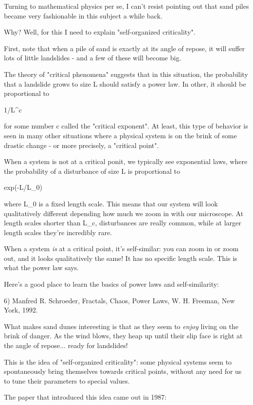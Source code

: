 Turning to mathematical physics per se, I can't resist pointing out
that sand piles became very fashionable in this subject a 
while back.

Why?  Well, for this I need to explain "self-organized criticality".

First, note that when a pile of sand is exactly at its angle of repose, 
it will suffer lots of little landslides - and a few of these will become 
big.  

The theory of "critical phenomena" suggests that in this situation,
the probability that a landslide grows to size L should satisfy a 
power law.  In other, it should be proportional to 

1/L^{c} 

for some number c called the "critical exponent".  At least, this 
type of behavior is seen in many other situations where a physical 
system is on the brink of some drastic change - or more precisely,
a "critical point".

When a system is not at a critical ponit, we typically see exponential 
laws, where the probability of a disturbance of size L is proportional 
to

exp(-L/L_{0})

where L_{0} is a fixed length scale.  This means that our system will 
look qualitatively different depending how much we zoom in with our 
microscope.  At length scales shorter than L_c, disturbances are
really common, while at larger length scales they're incredibly rare.

When a system \emph{is} at a critical point, it's self-similar: you can 
zoom in or zoom out, and it looks qualitatively the same!  It has
no specific length scale.  This is what the power law says.

Here's a good place to learn the basics of power laws and self-similarity:

6) Manfred R. Schroeder, Fractals, Chaos, Power Laws, W. H. Freeman, 
New York, 1992.

What makes sand dunes interesting is that as they seem to \emph{enjoy}
living on the brink of danger.  As the wind blows, they heap up until
their slip face is right at the angle of repose... ready for landslides!

This is the idea of "self-organized criticality": some physical 
systems 
seem to spontaneously bring themselves towards critical points, without 
any need for us to tune their parameters to special values.  

The paper that introduced this idea came out in 1987:

